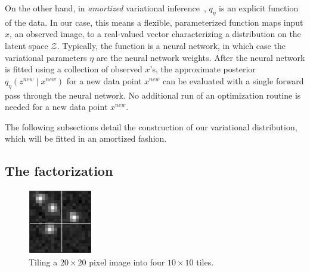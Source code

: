 
On the other hand,
in {\itshape amortized} variational
inference~\citep{kingma2013autoencoding, rezende2014stochastic}, $q_\eta$ is an explicit function of the data.
In our case, this means a flexible, parameterized function maps input $x$, an observed image, to a real-valued vector characterizing a distribution on the latent space $\mathcal{Z}$.
Typically, the function is a neural network, in which case the variational parameters $\eta$ are the neural network weights.
After the neural network is fitted using a collection of observed $x$'s, the approximate posterior $q_\eta(z^{new} \mid x^{new})$ for a new data point
$x^{new}$ can be evaluated with a single forward pass through the neural network.
No additional run of an optimization routine is needed for a new data point $x^{new}$.

The following subsections detail the construction of our variational distribution, which will 
be fitted in an amortized fashion. 


\subsection{The factorization}
\label{sec:factorization}


\begin{figure}[tb]
    \centering
    \includegraphics[width = 0.25\textwidth]{figures_vg/vi_figures/example_tiled_10.eps}
    \caption{Tiling a $20 \times 20$ pixel image into four $10 \times 10$ tiles.}
    \label{fig:ex_tiles}
\end{figure}

